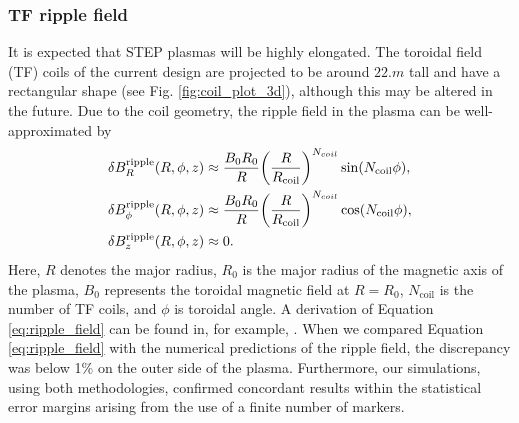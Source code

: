 \documentclass[10pt, a4paper, twoside]{article}
\begin{document}
\subsubsection{TF ripple field}
\label{sec:tf_ripple_field}

It is expected that STEP plasmas will be highly elongated. The toroidal field (TF) coils of the current design are projected to be around $\si{22.m}$ tall and have a rectangular shape (see Fig. \ref{fig:coil_plot_3d}), although this may be altered in the future. Due to the coil geometry, the ripple field in the plasma can be well-approximated by
\begin{equation}
    \label{eq:ripple_field}
    \begin{aligned}
        \delta B_R^{\text{ripple}}(R, \phi, z) &\approx \frac{B_0 R_0}{R} \qty(\frac{R}{R_{\text{coil}}})^{N_{coil}}\sin(N_{\text{coil}}\phi), \\
        \delta B_\phi^{\text{ripple}}(R, \phi, z) &\approx \frac{B_0 R_0}{R} \qty(\frac{R}{R_{\text{coil}}})^{N_{coil}}\cos(N_{\text{coil}}\phi),\\
        \delta B_z^{\text{ripple}}(R, \phi, z) &\approx 0.
    \end{aligned}
\end{equation}
Here, $R$ denotes the major radius, $R_0$ is the major radius of the magnetic axis of the plasma, $B_0$ represents the toroidal magnetic field at $R=R_0$, $N_{\text{coil}}$ is the number of TF coils, and $\phi$ is toroidal angle. A derivation of Equation \eqref{eq:ripple_field} can be found in, for example, \cite{mcclements2005}. When we compared Equation \eqref{eq:ripple_field} with the numerical predictions of the ripple field, the discrepancy was below 1\% on the outer side of the plasma. Furthermore, our simulations, using both methodologies, confirmed concordant results within the statistical error margins arising from the use of a finite number of markers.
\end{document}
